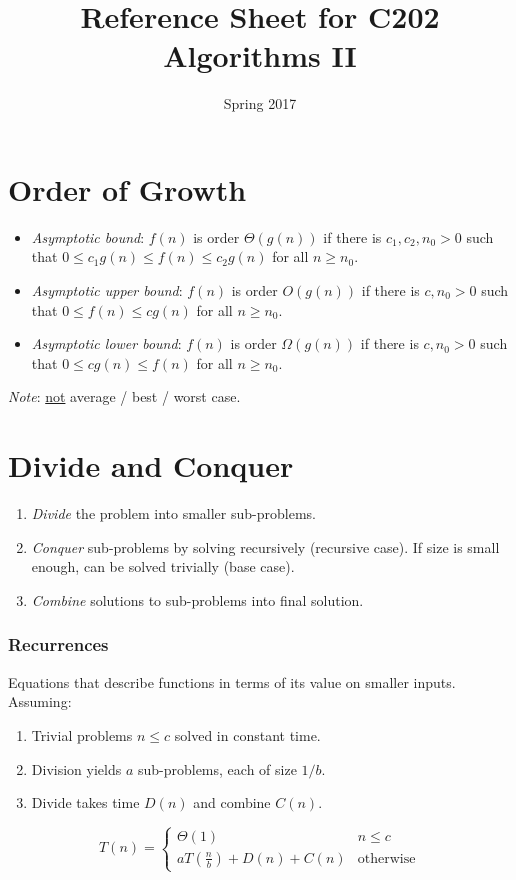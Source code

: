 \documentclass[twocolumn,english]{article}
\numberwithin{equation}{section}
\numberwithin{figure}{section}
\numberwithin{table}{section}
\begin{document}
\title{Reference Sheet for C202 Algorithms II}

\date{Spring 2017}
\maketitle

\section{Order of Growth}
\begin{itemize}
\item \emph{Asymptotic bound}: $f\left(n\right)$ is order $\Theta\left(g\left(n\right)\right)$
if there is $c_{1},c_{2},n_{0}>0$ such that $0\leq c_{1}g\left(n\right)\leq f\left(n\right)\leq c_{2}g\left(n\right)$
for all $n\geq n_{0}$.
\item \emph{Asymptotic upper bound}: $f\left(n\right)$ is order $O\left(g\left(n\right)\right)$
if there is $c,n_{0}>0$ such that $0\leq f\left(n\right)\leq cg\left(n\right)$
for all $n\geq n_{0}$.
\item \emph{Asymptotic lower bound}: $f\left(n\right)$ is order $\Omega\left(g\left(n\right)\right)$
if there is $c,n_{0}>0$ such that $0\leq cg\left(n\right)\leq f\left(n\right)$
for all $n\geq n_{0}$.
\end{itemize}
\emph{Note}: \uline{not} average / best / worst case.

\section{Divide and Conquer}
\begin{enumerate}
\item \emph{Divide} the problem into smaller sub-problems.
\item \emph{Conquer} sub-problems by solving recursively (recursive case).
If size is small enough, can be solved trivially (base case).
\item \emph{Combine} solutions to sub-problems into final solution.
\end{enumerate}

\subsubsection*{Recurrences}

Equations that describe functions in terms of its value on smaller
inputs. Assuming:
\begin{enumerate}
\item Trivial problems $n\leq c$ solved in constant time.
\item Division yields $a$ sub-problems, each of size $1/b$.
\item Divide takes time $D\left(n\right)$ and combine $C\left(n\right)$.
\end{enumerate}
\[
T\left(n\right)=\begin{cases}
\Theta\left(1\right) & n\leq c\\
aT\left(\frac{n}{b}\right)+D\left(n\right)+C\left(n\right) & \text{otherwise}
\end{cases}
\]
\end{document}
